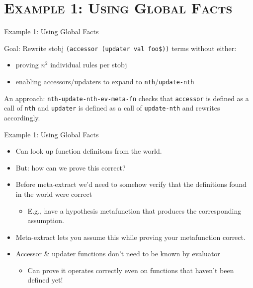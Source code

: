 \section[\scshape Example 1]{\scshape Example 1: Using Global Facts}
\begin{frame}[fragile]{Example 1: Using Global Facts}

Goal: Rewrite stobj \texttt{(accessor (updater val foo\$))} terms without either:
\begin{itemize}
\item proving $n^2$ individual rules per stobj
\item enabling accessors/updaters to expand to \texttt{nth}/\texttt{update-nth}
\end{itemize}
An approach: \texttt{nth-update-nth-ev-meta-fn} checks that
\texttt{accessor} is defined as a call of \texttt{nth} and
\texttt{updater} is defined as a call of \texttt{update-nth} and
rewrites accordingly.
\end{frame}
\begin{frame}[fragile]{Example 1: Using Global Facts}
\begin{itemize}
\item Can look up function definitons from the world.
\item But: how can we prove this correct?
\item Before meta-extract we'd need to somehow verify that the definitions found in the world were correct
  \begin{itemize}
  \item E.g., have a hypothesis metafunction that produces the corresponding assumption.
  \end{itemize}
\item Meta-extract lets you assume this while proving your metafunction correct.
\item Accessor \& updater functions don't need to be known by evaluator
\begin{itemize}
  \item Can prove it operates correctly even on functions that haven't been defined yet!
\end{itemize}
\end{itemize}
\end{frame}
